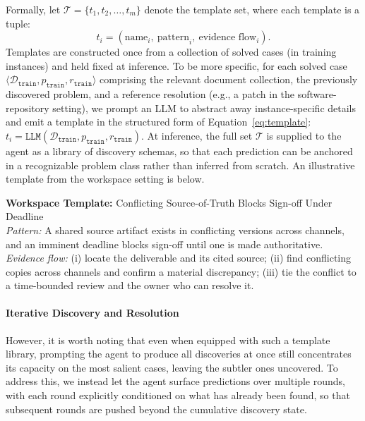 Formally, let $\mathcal{T} = \{t_1, t_2, \dots, t_m\}$ denote the template set, where each template is a tuple:
\begin{equation}
t_i = (\text{name}_i,\ \text{pattern}_i,\ \text{evidence flow}_i).
\label{eq:template}
\end{equation}
Templates are constructed once from a collection of solved cases (in training instances) and held fixed at inference. To be more specific, for each solved case $\langle \mathcal{D}_{\texttt{train}}, p_{\texttt{train}}, r_{\texttt{train}} \rangle$ comprising the relevant document collection, the previously discovered problem, and a reference resolution (e.g., a patch in the software-repository setting), we prompt an LLM to abstract away instance-specific details and emit a template in the structured form of Equation~\ref{eq:template}:
$
t_i = \texttt{LLM}(\mathcal{D}_{\texttt{train}}, p_{\texttt{train}}, r_{\texttt{train}}).
$
At inference, the full set $\mathcal{T}$ is supplied to the agent as a library of discovery schemas, so that each prediction can be anchored in a recognizable problem class rather than inferred from scratch. An illustrative template from the workspace setting is below.

\begin{tcolorbox}[colback=gray!5, colframe=gray!50, boxrule=0.5pt, arc=2mm, left=4pt, right=4pt, top=3pt, bottom=3pt]
\noindent\textbf{Workspace Template:} Conflicting Source-of-Truth Blocks Sign-off Under Deadline\\[2pt]
\emph{Pattern:} A shared source artifact exists in conflicting versions across channels, and an imminent deadline blocks sign-off until one is made authoritative.\\
\emph{Evidence flow:} (i) locate the deliverable and its cited source; (ii) find conflicting copies across channels and confirm a material discrepancy; (iii) tie the conflict to a time-bounded review and the owner who can resolve it.
\end{tcolorbox}

\paragraph{Iterative Discovery and Resolution}
However, it is worth noting that even when equipped with such a template library, prompting the agent to produce all discoveries at once still concentrates its capacity on the most salient cases, leaving the subtler ones uncovered. To address this, we instead let the agent surface predictions over multiple rounds, with each round explicitly conditioned on what has already been found, so that subsequent rounds are pushed beyond the cumulative discovery state.


